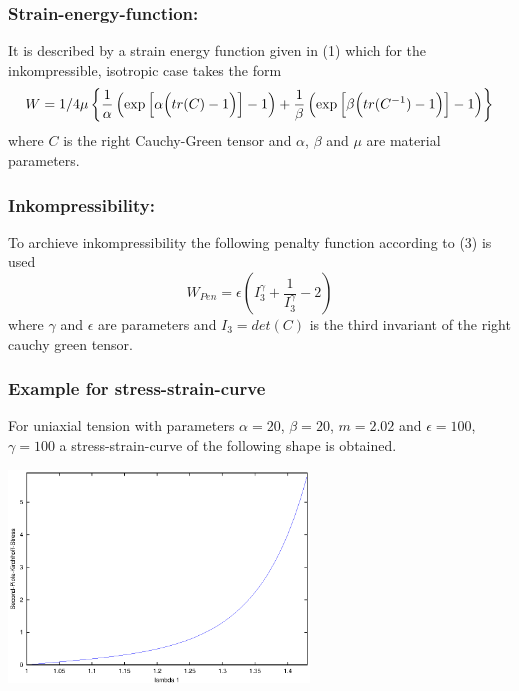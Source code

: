 \subsubsection*{Strain-energy-function:}
It is described by a strain energy function given in (1) which for the inkompressible, isotropic case takes the form
\begin{displaymath}
	W = 1/4\mu\left\{\frac{1}{\alpha} \left( \exp \left[ \alpha \Bigl(tr(C)-1 \Bigr) \right]  -1    \right) +	\frac{1}{\beta} \left( \exp \left[ \beta \Bigl(tr(C^{-1})-1   \Bigr) \right]  -1    \right) 
	\right\}
\end{displaymath}
\noindent where $C$ is the right Cauchy-Green tensor and $\alpha$, $\beta$ and $\mu$ are material parameters.

\subsubsection*{Inkompressibility:}
To archieve inkompressibility the following penalty function according to (3) is used 
\begin{displaymath}
	W_{Pen} = \epsilon \left(I_3^\gamma+\frac{1}{I_3^\gamma}-2  \right)
\end{displaymath}
\noindent where $\gamma$ and $\epsilon$ are parameters and $I_3=det(C)$ is the third invariant of the right cauchy green tensor.

\subsubsection*{Example for stress-strain-curve}
For uniaxial tension with parameters $\alpha=20$, $\beta = 20$, $m=2.02$ and $\epsilon=100$, $\gamma=100$ a stress-strain-curve of the following shape is obtained.
\begin{center}
\includegraphics[width=80mm]{figures/stress-strain}
\end{center}

